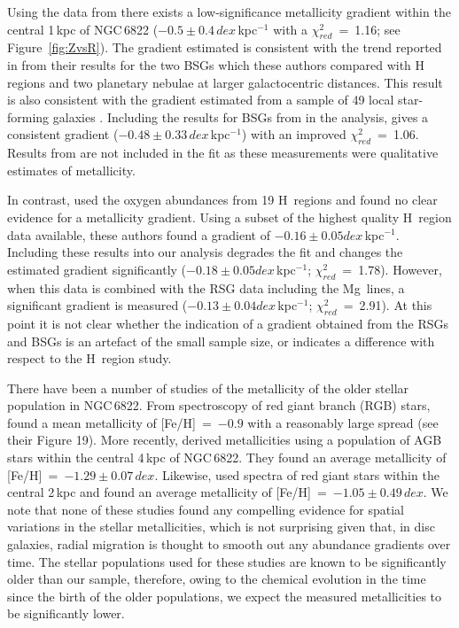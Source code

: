 Using the data from \citep[][i.e excluding Mg\,\1]{2015ApJ...803...14P} there exists a low-significance metallicity gradient within the central 1\,kpc of NGC\,6822
($-0.5\pm0.4\,dex\,$kpc$^{-1}$ with a $\chi^{2}_{red}$~=~1.16; see Figure~\ref{fig:ZvsR}).
The gradient estimated is consistent with the trend reported in
\cite{2001ApJ...547..765V}
from their results for the two BSGs which these authors compared with H\,\2 regions
\citep{1980MNRAS.193..219P} and two planetary nebulae
\citep{1995ApJ...445..642R} at larger galactocentric distances.
This result is also consistent with the gradient estimated from a sample of 49 local star-forming galaxies
\citep{2015MNRAS.448.2030H}.
Including the results for BSGs from
\cite{2001ApJ...547..765V}
in the analysis,
gives a consistent gradient
($-0.48\pm 0.33\,dex$\,kpc$^{-1}$)
with an improved
$\chi^{2}_{red}$~=~1.06.
Results from
\cite{1999A&A...352L..40M} are not included in the fit as these measurements were qualitative estimates of metallicity.



In contrast,
\cite{2006ApJ...642..813L} used the oxygen abundances from 19 H\,\2
regions and found no clear evidence for a metallicity gradient.
Using a subset of the highest quality H\,\2
region data available, these authors found a gradient of
$-0.16\pm0.05dex\,$kpc$^{-1}$.
Including these results into our analysis degrades the fit and changes the estimated gradient significantly
($-0.18\pm0.05dex\,$kpc$^{-1}$; $\chi^{2}_{red}$~=~1.78).
However, when this data is combined with the RSG data including the Mg\,\1 lines, a significant gradient is measured
($-0.13\pm0.04dex\,$kpc$^{-1}$; $\chi^{2}_{red}$~=~2.91).
At this point it is not clear whether the indication of a gradient obtained from the RSGs and BSGs is an artefact of the small sample size,
or indicates a difference with respect to the H\,\2 region study.


There have been a number of studies of the metallicity of the older stellar population in NGC\,6822.
From spectroscopy of red giant branch (RGB) stars,
\cite{2001MNRAS.327..918T} found a mean metallicity of [Fe/H]~=~$-0.9$
with a reasonably large spread (see their Figure 19).
More recently,
\cite{2012A&A...540A.135S} derived metallicities using a population of AGB stars within the central 4\,kpc of NGC\,6822.
They found an average metallicity of [Fe/H]~=~$-1.29\pm0.07\,dex$.
Likewise,
\cite{2013ApJ...779..102K}
used spectra of red giant stars within the central 2\,kpc and found an average metallicity of
[Fe/H]~=~$-1.05\pm0.49\,dex$.
We note that none of these studies found any compelling evidence for spatial variations in the stellar metallicities,
which is not surprising given that, in disc galaxies, radial migration is thought to smooth out any abundance gradients over time.
The stellar populations used for these studies are known to be significantly older than our sample,
therefore, owing to the chemical evolution in the time since the birth of the older populations,
we expect the measured metallicities to be significantly lower.

